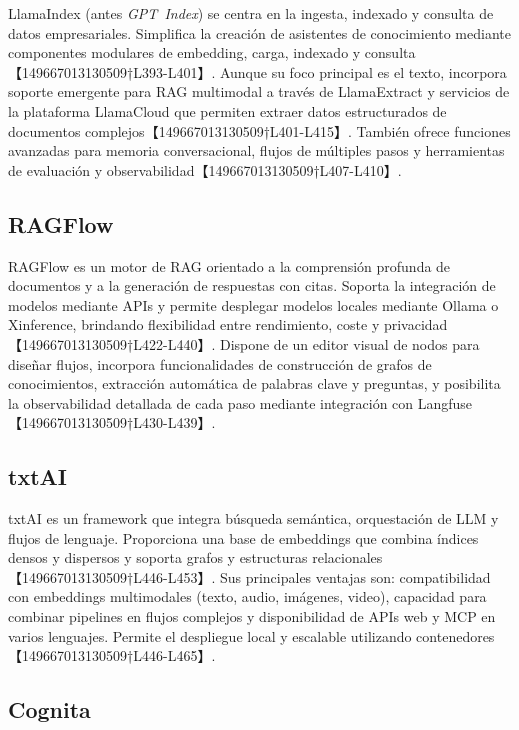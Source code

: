 LlamaIndex (antes \textit{GPT Index}) se centra en la ingesta, indexado y consulta de datos empresariales.  Simplifica la creación de asistentes de conocimiento mediante componentes modulares de embedding, carga, indexado y consulta【149667013130509†L393-L401】.  Aunque su foco principal es el texto, incorpora soporte emergente para RAG multimodal a través de LlamaExtract y servicios de la plataforma LlamaCloud que permiten extraer datos estructurados de documentos complejos【149667013130509†L401-L415】.  También ofrece funciones avanzadas para memoria conversacional, flujos de múltiples pasos y herramientas de evaluación y observabilidad【149667013130509†L407-L410】.

\subsection{RAGFlow}

RAGFlow es un motor de RAG orientado a la comprensión profunda de documentos y a la generación de respuestas con citas.  Soporta la integración de modelos mediante APIs y permite desplegar modelos locales mediante Ollama o Xinference, brindando flexibilidad entre rendimiento, coste y privacidad【149667013130509†L422-L440】.  Dispone de un editor visual de nodos para diseñar flujos, incorpora funcionalidades de construcción de grafos de conocimientos, extracción automática de palabras clave y preguntas, y posibilita la observabilidad detallada de cada paso mediante integración con Langfuse【149667013130509†L430-L439】.

\subsection{txtAI}

txtAI es un framework que integra búsqueda semántica, orquestación de LLM y flujos de lenguaje.  Proporciona una base de embeddings que combina índices densos y dispersos y soporta grafos y estructuras relacionales【149667013130509†L446-L453】.  Sus principales ventajas son: compatibilidad con embeddings multimodales (texto, audio, imágenes, video), capacidad para combinar pipelines en flujos complejos y disponibilidad de APIs web y MCP en varios lenguajes.  Permite el despliegue local y escalable utilizando contenedores【149667013130509†L446-L465】.

\subsection{Cognita}

